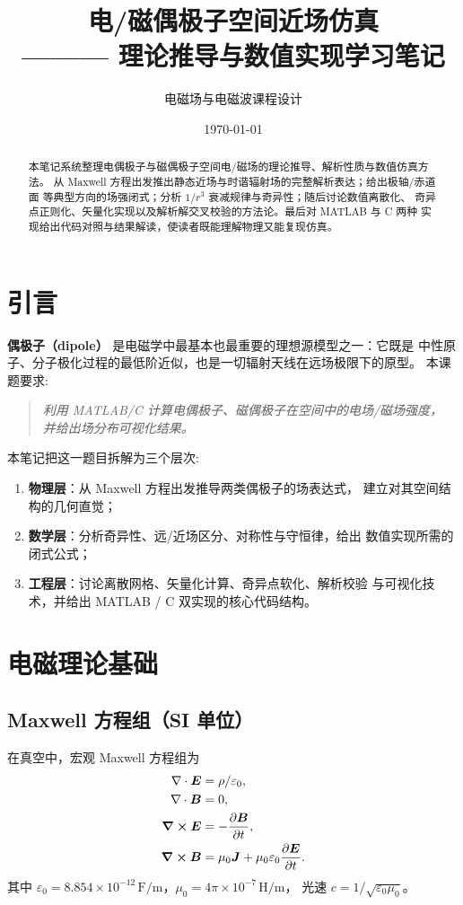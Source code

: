 \documentclass[11pt,a4paper]{article}
\title{\bfseries 电/磁偶极子空间近场仿真\\[4pt]
       \large ——— 理论推导与数值实现学习笔记}
\author{电磁场与电磁波课程设计}
\date{\today}
\newcommand{\epso}{\varepsilon_{0}}
\newcommand{\muo}{\mu_{0}}
\newcommand{\Evec}{\bm E}
\newcommand{\Bvec}{\bm B}
\newcommand{\Jvec}{\bm J}
\newcommand{\diver}{\nabla\cdot}
\begin{document}
\maketitle
\begin{abstract}
本笔记系统整理电偶极子与磁偶极子空间电/磁场的理论推导、解析性质与数值仿真方法。
从 Maxwell 方程出发推出静态近场与时谐辐射场的完整解析表达；给出极轴/赤道面
等典型方向的场强闭式；分析 $1/r^{3}$ 衰减规律与奇异性；随后讨论数值离散化、
奇异点正则化、矢量化实现以及解析解交叉校验的方法论。最后对 MATLAB 与 C 两种
实现给出代码对照与结果解读，使读者既能理解物理又能复现仿真。
\end{abstract}

\tableofcontents
\clearpage

\section{引言}
\textbf{偶极子（dipole）} 是电磁学中最基本也最重要的理想源模型之一：它既是
中性原子、分子极化过程的最低阶近似，也是一切辐射天线在远场极限下的原型。
本课题要求:
\begin{quote}
    \itshape 利用 MATLAB/C 计算电偶极子、磁偶极子在空间中的电场/磁场强度，
    并给出场分布可视化结果。
\end{quote}

本笔记把这一题目拆解为三个层次:
\begin{enumerate}
    \item \textbf{物理层}：从 Maxwell 方程出发推导两类偶极子的场表达式，
          建立对其空间结构的几何直觉；
    \item \textbf{数学层}：分析奇异性、远/近场区分、对称性与守恒律，给出
          数值实现所需的闭式公式；
    \item \textbf{工程层}：讨论离散网格、矢量化计算、奇异点软化、解析校验
          与可视化技术，并给出 MATLAB / C 双实现的核心代码结构。
\end{enumerate}

\section{电磁理论基础}

\subsection{Maxwell 方程组（SI 单位）}
在真空中，宏观 Maxwell 方程组为
\begin{align}
    \diver \Evec &= \rho/\epso, \label{eq:gauss-e}\\
    \diver \Bvec &= 0, \label{eq:gauss-b}\\
    \curl \Evec &= -\pdv{\Bvec}{t}, \label{eq:faraday}\\
    \curl \Bvec &= \muo \Jvec + \muo\epso\pdv{\Evec}{t}. \label{eq:ampere}
\end{align}
其中 $\epso=8.854\times10^{-12}\,\mathrm{F/m}$，$\muo=4\pi\times10^{-7}\,\mathrm{H/m}$，
光速 $c=1/\sqrt{\epso\muo}$。
\end{document}
